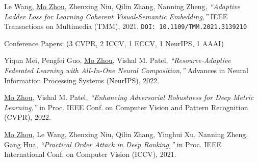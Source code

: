 \documentclass[10pt,margin,line,pifont,palatino,courier]{res}
\begin{document}
\begin{resume}
\begin{enumerate}[noitemsep, leftmargin=*, label={[J0{\arabic*}]}]
\item Le Wang, \underline{Mo Zhou},
\reversemarginpar{}
Zhenxing Niu, Qilin Zhang, Nanning Zheng,
\textit{``Adaptive Ladder Loss for Learning Coherent Visual-Semantic Embedding,''}
IEEE Transactions on Multimedia (TMM), 2021.
\texttt{DOI: 10.1109/TMM.2021.3139210}

\end{enumerate}

	{\sc Conference Papers:}\hfill
	(3 CVPR, 2 ICCV, 1 ECCV, 1 NeurIPS, 1 AAAI)\\

\begin{enumerate}[noitemsep, leftmargin=*, label={[C0{\arabic*}]}]

\item Yiqun Mei, Pengfei Guo, \underline{Mo Zhou}, Vishal M. Patel,
\reversemarginpar{}
\textit{``Resource-Adaptive Federated Learning with All-In-One Neural Composition,''}
Advances in Neural Information Processing Systems (NeurIPS), 2022.

\item \underline{Mo Zhou}, Vishal M. Patel,
\reversemarginpar{}
\textit{``Enhancing Adversarial Robustness for Deep Metric Learning,''}
in Proc. IEEE Conf. on Computer Vision and Pattern Recognition (CVPR), 2022.

\item \underline{Mo Zhou},
\reversemarginpar{}
Le Wang, Zhenxing Niu, Qilin Zhang, Yinghui Xu, Nanning Zheng, Gang Hua,
\textit{``Practical Order Attack in Deep Ranking,''}
in Proc. IEEE International Conf. on Computer Vision (ICCV), 2021.


\end{enumerate}
\end{resume}
\end{document}
